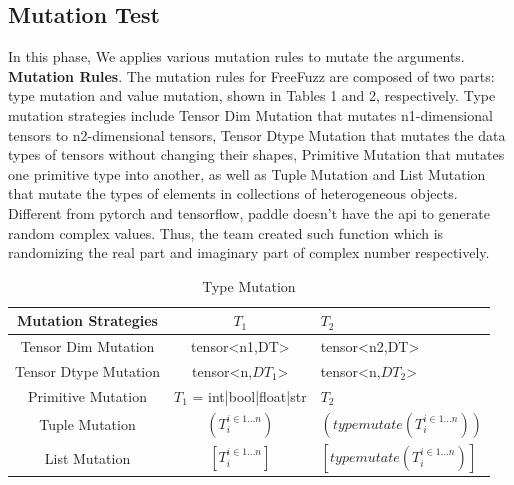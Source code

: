 \documentclass[sigconf]{acmart}
\begin{document}
  \subsection{Mutation Test}

  In this phase, We applies various mutation rules to mutate the arguments.\cite{w1}
  \newline \textbf{Mutation Rules}. The mutation rules for FreeFuzz are composed
  of two parts: type mutation and value mutation, shown in Tables 1
  and 2, respectively. Type mutation strategies include Tensor Dim
  Mutation that mutates n1-dimensional tensors to n2-dimensional
  tensors, Tensor Dtype Mutation that mutates the data types of tensors without changing their shapes, Primitive Mutation that mutates
  one primitive type into another, as well as Tuple Mutation and List
  Mutation that mutate the types of elements in collections of heterogeneous objects.\cite{w1}
  \newline Different from pytorch and tensorflow, paddle doesn't have the api to generate random complex values. Thus, the team
  created such function which is randomizing the real part and imaginary part of complex number respectively.
 
  \begin{table}[h]
    \centering
    \caption{Type Mutation}
    \label{tab:freq}
    \begin{tabular}{ccl}
      \toprule
      Mutation Strategies&$T_1$&$T_2$\\
      \midrule
      Tensor Dim Mutation & tensor<n1,DT>& tensor<n2,DT>\\
      Tensor Dtype Mutation & tensor<n,$DT_1$>& tensor<n,$DT_2$>\\
      Primitive Mutation & $T_1$ = int|bool|float|str & $T_2$\\
      Tuple Mutation & $(T_i ^ {i\in 1...n})$&$(typemutate(T_i ^ {i\in 1...n}))$ \\
      List Mutation & $[T_i ^ {i\in 1...n}]$&$[typemutate(T_i ^ {i\in 1...n})]$ \\
    \bottomrule
  \end{tabular}
  \end{table}
\end{document}
